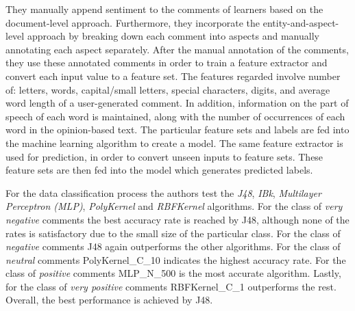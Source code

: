 They manually append sentiment to the comments of learners
based on the document-level approach.
Furthermore, they incorporate the entity-and-aspect-level approach
by breaking down each comment into aspects and manually annotating each aspect separately.
After the manual annotation of the comments,
they use these annotated comments in order to train a feature extractor
and convert each input value to a feature set.
The features regarded involve number of: letters, words, capital/small letters,
special characters, digits, and average word length of a user-generated comment.
In addition, information on the part of speech of each word is maintained,
along with the number of occurrences of each word in the opinion-based text.
The particular feature sets and labels are fed into the machine learning algorithm
to create a model.
The same feature extractor is used for prediction,
in order to convert unseen inputs to feature sets.
These feature sets are then fed into the model which generates predicted labels.

For the data classification process
the authors test the \emph{J48}, \emph{IBk}, \emph{Multilayer Perceptron (MLP)},
\emph{PolyKernel} and \emph{RBFKernel} algorithms.
For the class of \emph{very negative} comments
the best accuracy rate is reached by J48,
although none of the rates is satisfactory
due to the small size of the particular class.
For the class of \emph{negative} comments J48 again outperforms the other algorithms.
For the class of \emph{neutral} comments
PolyKernel\_C\_10 indicates the highest accuracy rate.
For the class of \emph{positive} comments MLP\_N\_500 is the most accurate algorithm.
Lastly, for the class of \emph{very positive} comments RBFKernel\_C\_1 outperforms the rest.
Overall, the best performance is achieved by J48.
